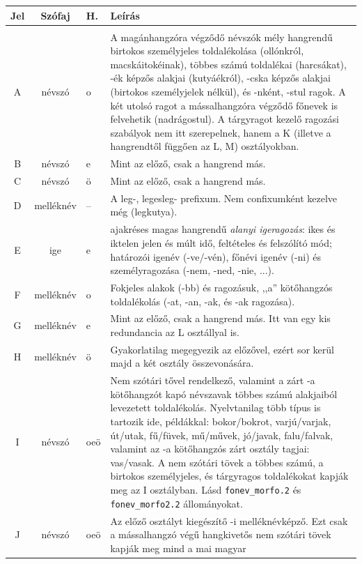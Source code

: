 \begin{longtable}[l]{cclp{12cm}}
\hline Jel & Szófaj & H. & Leírás
\\ \hline \endhead
\hline \endfoot
\\ \hline  A &  névszó & o & A magánhangzóra végződő névszók mély
hangrendű birtokos személyjeles toldalékolása (ollónkról,
macskáitokéinak), többes számú toldalékai (harcsákat),
-ék képzős alakjai (kutyáékról), -cska képzős alakjai (birtokos
személyjelek nélkül), és -nként, -stul ragok. A két utolsó
ragot a mássalhangzóra végződő főnevek is felvehetik (nadrágostul).
A tárgyragot kezelő ragozási szabályok nem itt szerepelnek, hanem a K (illetve a hangrendtől
függően az L, M) osztályokban.
\\ \hline  B &  névszó & e & Mint az előző, csak a hangrend más.
\\ \hline  C &  névszó & ö & Mint az előző, csak a hangrend más.
\\ \hline  D &  melléknév & -- & A leg-, legesleg- prefixum. Nem confixumként
kezelve még (legkutya).
\\ \hline  E &  ige & e & ajakréses magas hangrendű \emph{alanyi igeragozás}: ikes és iktelen jelen és múlt
idő, feltételes és felszólító mód; határozói igenév (-ve/-vén),
főnévi igenév (-ni) és személyragozása (-nem, -ned, -nie, ...).
\\ \hline  F &  melléknév & o & Fokjeles alakok (-bb) és ragozásuk,
,,a'' kötőhangzós toldalékolás (-at, -an, -ak, és -ak ragozása).
\\ \hline  G &  melléknév & e & Mint az előző, csak a hangrend más.
Itt van egy kis redundancia az L osztállyal is.
\\ \hline  H &  melléknév & ö &  Gyakorlatilag megegyezik az előzővel,
ezért sor kerül majd a két osztály összevonására.
\\ \hline  I &  névszó & oeö & Nem szótári tővel rendelkező, valamint a zárt
-a kötőhangzót kapó névszavak többes számú alakjaiból levezetett toldalékolás.
Nyelvtanilag több típus is tartozik ide, példákkal: bokor/bokrot, varjú/varjak,
út/utak, fű/füvek, mű/művek, jó/javak, falu/falvak, valamint az -a kötőhangzós
zárt osztály tagjai: vas/vasak. A nem szótári tövek a többes számú,
a birtokos személyjeles, és tárgyragos toldalékokat kapják meg az I
osztályban. Lásd \texttt{fonev\_morfo.2} és \texttt{fonev\_morfo2.2} állományokat.
\\ \hline  J &  névszó & oeö & Az előző osztályt kiegészítő -i melléknévképző.
Ezt csak a mássalhangzó végű hangkivetős nem szótári tövek kapják meg mind a mai magyar

\end{longtable}
